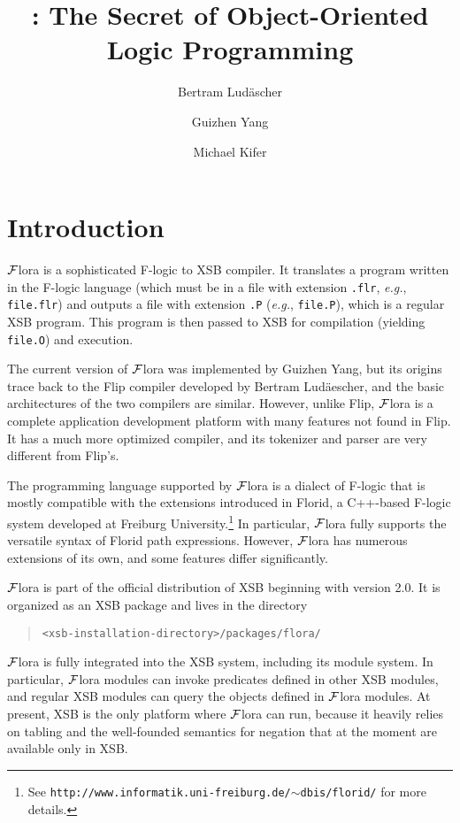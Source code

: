 \documentclass[11pt]{article}
\title{\FLORA: The Secret of Object-Oriented Logic Programming}
\author{
  Bertram Lud\"ascher
  \and
  Guizhen Yang
  \and
  Michael Kifer
  }
\newcommand{\FLIP}{{\mbox{\sc Flip}}\xspace}
\newcommand{\FLORA}{{\mbox{${\cal F}${\sc lora}}}\xspace}
\newcommand{\FLORID}{{\mbox{\sc Florid}}\xspace}
\begin{document}
\maketitle


\section{Introduction}

\FLORA is a sophisticated F-logic to XSB compiler. It translates a program
written in the F-logic language \cite{KLW95} (which must be in a file with
extension {\tt .flr}, {\it e.g.}, {\tt file.flr}) and outputs a file with
extension {\tt .P} ({\it e.g.}, {\tt file.P}), which is a regular XSB
program. This program is then passed to XSB for compilation (yielding {\tt
  file.O}) and execution.

The current version of \FLORA was implemented by Guizhen Yang, but its 
origins trace back to the \FLIP compiler developed by Bertram
Lud\"aescher, and the basic architectures of the two compilers are similar.
However, unlike \FLIP, \FLORA is a complete application development
platform with many features not found in \FLIP. It has a much more
optimized compiler, and its tokenizer and parser are very different from
\FLIP's.

The programming language supported by \FLORA is a dialect of F-logic that
is mostly compatible with the extensions introduced in \FLORID, a C++-based
F-logic system developed at Freiburg University.\footnote{
  See {\tt http://www.informatik.uni-freiburg.de/$\sim$dbis/florid/} for more
  details.
  }
In particular, \FLORA fully supports the versatile syntax of \FLORID path
expressions. However, \FLORA has numerous extensions of its own, and some
features differ significantly.

\FLORA is part of the official distribution of XSB beginning with version
2.0. It is organized as an XSB package and lives in the directory
\begin{quote}
 \verb|<xsb-installation-directory>/packages/flora/|  
\end{quote}
\FLORA is fully integrated into the XSB system, including its module
system. In particular, \FLORA modules can invoke predicates defined in
other XSB modules, and regular XSB modules can query the objects defined in
\FLORA modules. At present, XSB is the only platform where \FLORA can run,
because it heavily relies on tabling and the well-founded semantics for
negation that at the moment are available only in XSB.
\end{document}
